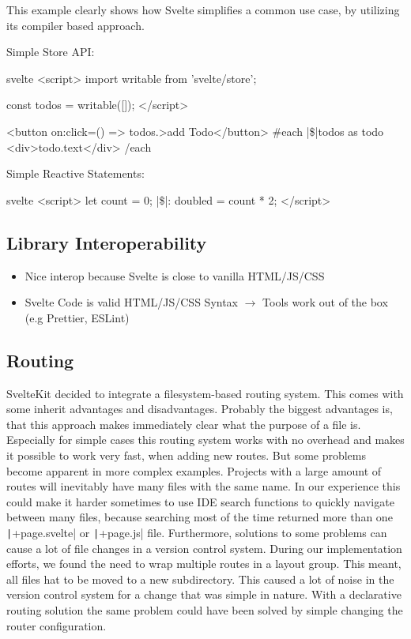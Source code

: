 This example clearly shows how Svelte simplifies a common use case, by utilizing its compiler based approach.

Simple Store API:
\begin{myminted}[escapeinside=||]{svelte}{}
<script>
    import { writable } from 'svelte/store';

    const todos = writable([]);
</script>

<button on:click={() => todos.}>add Todo</button>
{#each |\$|todos as todo}
    <div>{todo.text}</div>
{/each}
\end{myminted}

Simple Reactive Statements:
\begin{myminted}[escapeinside=||]{svelte}{}
<script>
    let count = 0;
    |\$|: doubled = count * 2;
</script>
\end{myminted}

\todo{}

\subsection{Library Interoperability}

\todo{}

\begin{itemize}
    \item Nice interop because Svelte is close to vanilla HTML/JS/CSS
    \item Svelte Code is valid HTML/JS/CSS Syntax $\rightarrow$ Tools work out of the box (e.g Prettier, ESLint)
\end{itemize}


\subsection{Routing}
SvelteKit decided to integrate a filesystem-based routing system. This comes with some inherit advantages and disadvantages. Probably the biggest advantages is, that this approach makes immediately clear what the purpose of a file is. Especially for simple cases this routing system works with no overhead and makes it possible to work very fast, when adding new routes. But some problems become apparent in more complex examples. Projects with a large amount of routes will inevitably have many files with the same name. In our experience this could make it harder sometimes to use IDE search functions to quickly navigate between many files, because searching most of the time returned more than one \texttt|+page.svelte| or \texttt|+page.js| file. Furthermore, solutions to some problems can cause a lot of file changes in a version control system. During our implementation efforts, we found the need to wrap multiple routes in a layout group. This meant, all files hat to be moved to a new subdirectory. This caused a lot of noise in the version control system for a change that was simple in nature. With a declarative routing solution the same problem could have been solved by simple changing the router configuration.

